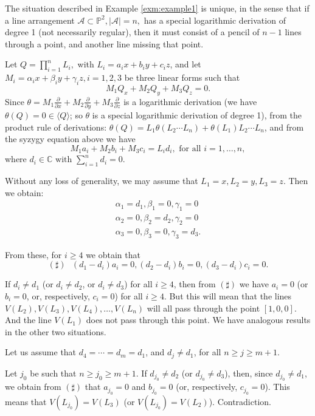 \documentclass[12pt]{amsart}
\begin{document}
\begin{rem}\label{rem:remark1} The situation described in Example \ref{exm:example1} is unique, in the sense that if a line arrangement $\mathcal A\subset \mathbb P^2, |\mathcal A|=n,$ has a special logarithmic derivation of degree 1 (not necessarily regular), then it must consist of a pencil of $n-1$ lines through a point, and another line missing that point.

Let $Q=\prod_{i=1}^nL_i,$ with $L_i=a_ix+b_iy+c_iz$, and let $M_i=\alpha_ix+\beta_iy+\gamma_iz, i=1,2,3$ be three linear forms such that $$M_1Q_x+M_2Q_y+M_3Q_z=0.$$ Since $\theta=M_1\frac{\partial}{\partial x}+M_2\frac{\partial}{\partial y}+M_3\frac{\partial}{\partial z}$ is a logarithmic derivation (we have $\theta(Q)=0\in\langle Q\rangle$; so $\theta$ is a special logarithmic derivation of degree 1), from the product rule of derivations: $\theta(Q)=L_1\theta(L_2\cdots L_n)+\theta(L_1)L_2\cdots L_n$, and from the syzygy equation above we have $$M_1a_i+M_2b_i+M_3c_i=L_id_i, \mbox{ for all }i=1,\ldots,n,$$  where $d_i\in\mathbb C\mbox{ with }\sum_{i=1}^nd_i=0$.

Without any loss of generality, we may assume that $L_1=x,L_2=y,L_3=z$. Then we obtain:
\begin{eqnarray}
\alpha_1=d_1,\beta_1=0,\gamma_1=0\nonumber\\
\alpha_2=0,\beta_2=d_2,\gamma_2=0\nonumber\\
\alpha_3=0,\beta_3=0,\gamma_3=d_3.\nonumber
\end{eqnarray}

From these, for $i\geq 4$ we obtain that $$(\sharp) \mbox{ }(d_1-d_i)a_i=0,(d_2-d_i)b_i=0,(d_3-d_i)c_i=0.$$

If $d_i\neq d_1$ (or $d_i\neq d_2$, or $d_i\neq d_3$) for all $i\geq 4$, then from $(\sharp)$ we have $a_i=0$ (or $b_i=0$, or, respectively, $c_i=0$) for all $i\geq 4$. But this will mean that the lines $V(L_2),V(L_3),V(L_4),\ldots,V(L_n)$ will all pass through the point $[1,0,0]$. And the line $V(L_1)$ does not pass through this point. We have analogous results in the other two situations.

Let us assume that $d_4=\cdots=d_m=d_1$, and $d_j\neq d_1$, for all $n\geq j\geq m+1$.

Let $j_0$ be such that $n\geq j_0\geq m+1$. If $d_{j_0}\neq d_2$ (or $d_{j_0}\neq d_3$), then, since $d_{j_0}\neq d_1$, we obtain from $(\sharp)$ that $a_{j_0}=0$ and $b_{j_0}=0$ (or, respectively, $c_{j_0}=0$). This means that $V(L_{j_0})=V(L_3)$ (or $V(L_{j_0})=V(L_2)$). Contradiction.


\end{rem}
\end{document}
